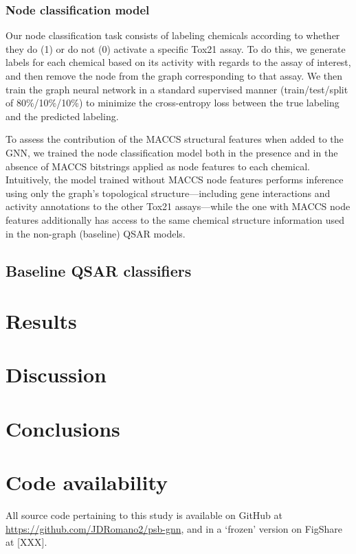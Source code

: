 \documentclass{ws-procs11x85}
\begin{document}
\subsubsection{Node classification model}
Our node classification task consists of labeling chemicals according to whether they do (1) or do not (0) activate a specific Tox21 assay.
To do this, we generate labels for each chemical based on its activity with regards to the assay of interest, and then remove the node from the graph corresponding to that assay.
We then train the graph neural network in a standard supervised manner (train/test/split of 80\%/10\%/10\%) to minimize the cross-entropy loss between the true labeling and the predicted labeling.

To assess the contribution of the MACCS structural features when added to the GNN, we trained the node classification model both in the presence and in the absence of MACCS bitstrings applied as node features to each chemical. Intuitively, the model trained without MACCS node features performs inference using only the graph's topological structure---including gene interactions and activity annotations to the other Tox21 assays---while the one with MACCS node features additionally has access to the same chemical structure information used in the non-graph (baseline) QSAR models.

\subsection{Baseline QSAR classifiers}

\section{Results}

\section{Discussion}

\section{Conclusions}

\section{Code availability}
All source code pertaining to this study is available on GitHub at \url{https://github.com/JDRomano2/psb-gnn}, and in a `frozen' version on FigShare at [XXX].
\end{document}
